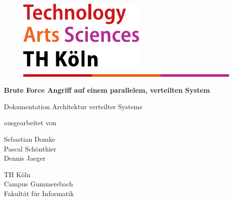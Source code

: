 
\begin{titlepage}

\begin{center}
\begin{figure}[!ht]
	\flushright
		\includegraphics[width=.2\textwidth]{images/logo.pdf}
		\includegraphics[width=\textwidth]{images/balken.png}
\end{figure}

\vspace{1.5cm}


\begin{rmfamily}
\begin{huge}
\textbf{Brute Force Angriff auf einem parallelem, verteilten System}\\	
\end{huge}
\vspace{0.5cm}
\end{rmfamily}

\vspace{1.6cm}

\begin{LARGE}
\begin{scshape}
Dokumentation Architektur verteilter Systeme\\[0.8em]
\end{scshape}
\end{LARGE}

\begin{large}
ausgearbeitet von\\ 
\vspace{0.2cm}
\begin{LARGE}
Sebastian Domke\\
Pascal Schönthier\\
Dennis Jaeger\\
\end{LARGE}
\end{large}

\vspace{1.0cm}

\begin{large} 
\vspace{0.2cm}
\begin{scshape}
TH Köln\\
Campus Gummersbach\\
Fakultät für Informatik
\end{scshape}
\end{large}


\end{center}
\end{titlepage}
